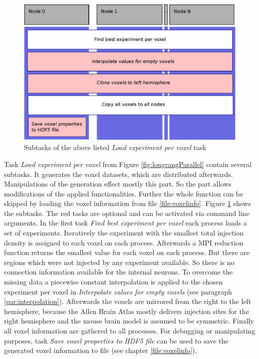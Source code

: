 \begin{figure}[ht!]
\centering
\includegraphics[scale=0.5]{pictures/longRange_BestExp_parallelAlg.eps}
\caption{Subtasks of the above listed \emph{Load experiment per voxel} task}
\label{fig:longrangeLEPV}
\end{figure}
Task \emph{Load experiment per voxel} from Figure \ref{fig:longrangParallel} contain several subtasks.
It generates the voxel datasets, which are distributed afterwards.
Manipulations of the generation effect mostly this part.
So the part allows modifications of the applied functionalities. 
Further the whole function can be skipped by loading the voxel information from file \ref{file:voxelinfo}.
Figure \ref{fig:longrangeLEPV} shows the subtasks.
The red tasks are optional and can be activated via command line arguments.
In the first task \emph{Find best experiment per voxel} each process loads a set of experiments.
Iteratively the experiment with the smallest total injection density is assigned to each voxel
on each process. Afterwards a MPI reduction function returns the smallest value for each voxel on
each process.
But there are regions which were not injected by any experiment available.
So there is no connection information available for the internal neurons.
To overcome the missing data a piecewise constant interpolation is applied to the chosen experiment per voxel
in \emph{Interpolate values for empty voxels} (see paragraph \ref{par:interpolation}).
Afterwards the voxels are mirrored from the right to the left hemisphere, because the
Allen Brain Atlas mostly delivers injection sites for the right hemisphere and
the mouse brain model is assumed to be symmetric.
Finally all voxel information are gathered to all processes.
For debugging or manipulating purposes, task \emph{Save voxel properties to HDF5 file} can be used
to save the generated voxel information to file (see chapter \ref{file:voxelinfo}).


